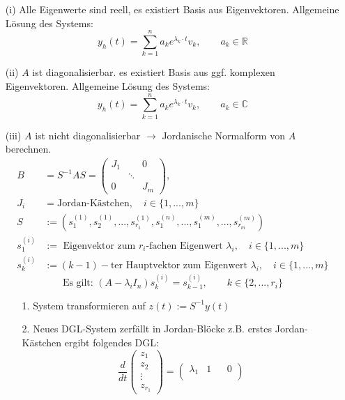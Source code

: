 \documentclass[a4paper]{article}
\newcommand{\R}{\mathbb{R}}
\begin{document}
\begin{enumerate}
	\item[(i)] Alle Eigenwerte sind reell,
		es existiert Basis aus Eigenvektoren. Allgemeine
		Lösung des Systems:
		\[
			y_h (t) = \sum_{k=1}^{n} a_k e ^{\lambda_k \cdot t}
			v_k, \qquad
			a_k \in \R
		\] 
	\item[(ii)] $A$ ist diagonalisierbar.
		es existiert Basis aus ggf. komplexen Eigenvektoren. Allgemeine
		Lösung des Systems:
		\[
			y_h (t) = \sum_{k=1}^{n} a_k e ^{\lambda_k \cdot t}
			v_k, \qquad
			a_k \in \mathbb{C}
		\] 
	\item[(iii)] $A$ ist nicht diagonalisierbar
		$\rightarrow$ Jordanische Normalform von $A$ berechnen.
		\begin{align*}
			B &= S ^{-1} A S =
			\begin{pmatrix} 
				J_1 & & 0 \\
					& \ddots & \\
				0 & & J_m
			\end{pmatrix}, \\
			J_i &= \text{Jordan-Kästchen}, \quad
			i \in \{
				1, ..., m
			\} \\
			S &:= \left(
				s_1 ^{(1)}, s_2 ^{(1)}, ...,
				s_{r_1} ^{(1)}, s_1 ^{(n)}, ...,
				s_1 ^{(m)}, ...,
				s_{r_m} ^{(m)}
			\right)  \\
			s_1 ^{(i)}  &:= \text{ Eigenvektor zum }
			r_i\text{-fachen Eigenwert } \lambda_i,\quad i \in \{
				1, ..., m
			\} 
			\\
			s_k ^{(i)} &:= (k-1)-\text{ter Hauptvektor zum}
			\text{ Eigenwert } \lambda_i,\quad i \in \{
				1, ..., m
			\} 
		\end{align*}
		\[
		\text{Es gilt: }
		\left(
			A - \lambda_i I_n
		\right) s_k ^{(i)} = s_{k-1} ^{(i)}, \qquad
		k \in \{
			2, ..., r_i
		\} 
		\] 
		\begin{enumerate}
			\item[1.] System transformieren auf $z(t) := S ^{-1} y(t)$
			\item[2.] Neues DGL-System zerfällt in Jordan-Blöcke
				z.B. erstes Jordan-Kästchen ergibt folgendes
				DGL:
				\[
				\frac{ d }{ dt } 
				\begin{pmatrix} 
					z_1 \\
					z_2 \\
					\vdots \\
					z_{r_1}
				\end{pmatrix} 
				=
				\begin{pmatrix} 
					\lambda_1 & 1 & & 0 \\

\end{pmatrix}\]
\end{enumerate}
\end{enumerate}
\end{document}
